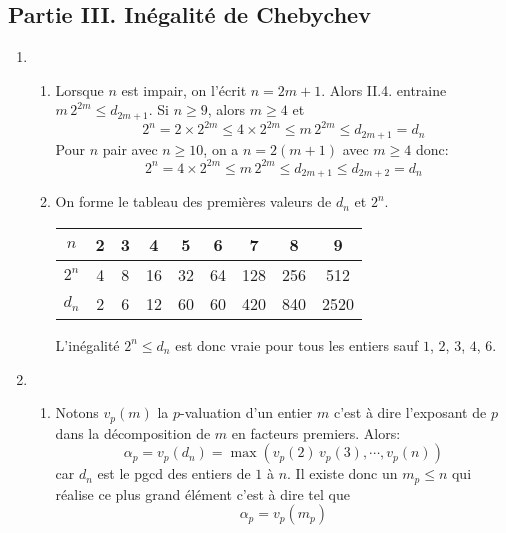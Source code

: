 \subsection*{Partie III. Inégalité de Chebychev}
\begin{enumerate}
 \item
\begin{enumerate}
 \item Lorsque $n$ est impair, on l'écrit $n=2m+1$.\newline
Alors II.4. entraine $m\,2^{2m}\leq d_{2m+1}$. Si $n\geq 9$, alors $m\geq4$ et
\begin{displaymath}
 2^n = 2\times 2^{2m}\leq 4\times 2^{2m} \leq m\,2^{2m}\leq d_{2m+1}=d_n
\end{displaymath}
Pour $n$ pair avec $n\geq10$, on a $n=2(m+1)$ avec $m\geq4$ donc:
\begin{displaymath}
 2^n = 4\times 2^{2m} \leq m\,2^{2m}\leq d_{2m+1}\leq d_{2m+2}=d_n
\end{displaymath}

 \item  On forme le tableau des premières valeurs de $d_n$ et $2^n$. 
\begin{center}
\vspace{0.2cm}
\renewcommand{\arraystretch}{1.2}
\begin{tabular}{|c|c|c|c|c|c|c|c|c|} \hline
$n$  & 2 & 3 & 4  & 5  & 6  & 7   & 8   & 9\\ \hline
$2^n$& 4 & 8 & 16 & 32 & 64 & 128 & 256 & 512 \\ \hline
$d_n$& 2 & 6 & 12 & 60 & 60 & 420 & 840 & 2520 \\ \hline 
\end{tabular}
\end{center}
\bigskip
L'inégalité $2^n\leq d_n$ est donc vraie pour tous les entiers sauf $1$, $2$, $3$, $4$, $6$.
\end{enumerate}

 \item 
\begin{enumerate}
 \item Notons $v_p(m)$ la $p$-valuation d'un entier $m$ c'est à dire l'exposant de $p$ dans la décomposition de $m$ en facteurs premiers. Alors:
\begin{displaymath}
\alpha_p = v_p(d_n) = \max \left(   v_p(2)\, v_p(3), \cdots , v_p(n) \right) 
\end{displaymath}
car $d_n$ est le pgcd des entiers de $1$ à $n$. Il existe donc un $m_p \leq n$ qui réalise ce plus grand élément c'est à dire tel que
\begin{displaymath}
 \alpha_p = v_p(m_p) 
\end{displaymath}


\end{enumerate}
\end{enumerate}
